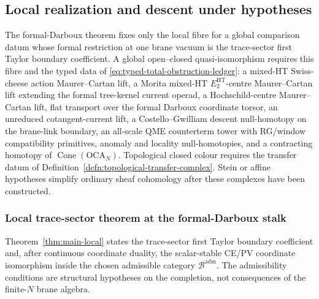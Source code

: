 \subsection{Local realization and descent under hypotheses}\label{ssec:local-relative-realizations}

The formal-Darboux theorem fixes only the local fibre for a global
comparison datum whose formal restriction at one brane vacuum is the
trace-sector first Taylor boundary coefficient.  A global open--closed quasi-isomorphism
requires this fibre
and the typed data of \eqref{eq:typed-total-obstruction-ledger}: a
mixed-HT Swiss-cheese action Maurer--Cartan lift, a Morita mixed-HT
\(E_2^{\mathrm{HT}}\)-centre Maurer--Cartan lift extending the formal
tree-kernel current operad, a Hochschild-centre Maurer--Cartan lift, flat transport
over the formal Darboux coordinate torsor, an unreduced cotangent-current
lift, a Costello--Gwilliam descent null-homotopy on the brane-link
boundary, an all-scale QME counterterm tower with RG/window
compatibility primitives, anomaly and locality
null-homotopies, and a contracting homotopy of
\(\operatorname{Cone}(\mathrm{OCA}_N)\).  Topological closed colour
requires the transfer datum of
Definition~\ref{defn:topological-transfer-complex}.  Stein or affine
hypotheses simplify ordinary sheaf cohomology after these complexes have
been constructed.

\subsubsection{Local trace-sector theorem at the formal-Darboux stalk}
\label{sssec:local-trace-sector-stalk}

Theorem~\ref{thm:main-local} states the trace-sector first Taylor
boundary coefficient and, after continuous coordinate duality, the
scalar-stable CE/PV coordinate isomorphism
inside the chosen admissible category \(\mathcal B^{\mathrm{adm}}\).
The admissibility conditions are structural hypotheses on the
completion, not consequences of the finite-\(N\) brane algebra.

